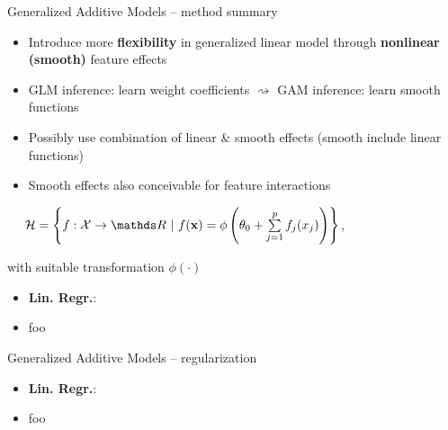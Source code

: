 \begin{vbframe}{Generalized Additive Models -- method summary}

  
 
\medskip

\begin{itemize}
  \item Introduce more \textbf{flexibility} in generalized linear model through
  \textbf{nonlinear (smooth)} feature effects
  \item GLM inference: learn weight coefficients $\rightsquigarrow$ GAM
  inference: learn smooth functions
  \item Possibly use combination of linear \& smooth effects
  (smooth include linear functions)
  \item Smooth effects also conceivable for feature interactions
\end{itemize}
\medskip

 ~~
$\Hspace = \left\{f: \Xspace \to \R ~|~\fx = \phi \left(\theta_0 + \sumjp
f_j(x_j) \right) \right\}$,

with suitable transformation $\phi(\cdot)$

\framebreak


\begin{itemize}
  \item \textbf{Lin. Regr.}:
\end{itemize}

\medskip


\begin{itemize}
    \item foo
\end{itemize}

\medskip

\end{vbframe}


\begin{frame}{Generalized Additive Models -- regularization}


\begin{itemize}
  \item \textbf{Lin. Regr.}:
\end{itemize}

\medskip


\begin{itemize}
    \item foo
\end{itemize}

\end{frame}

